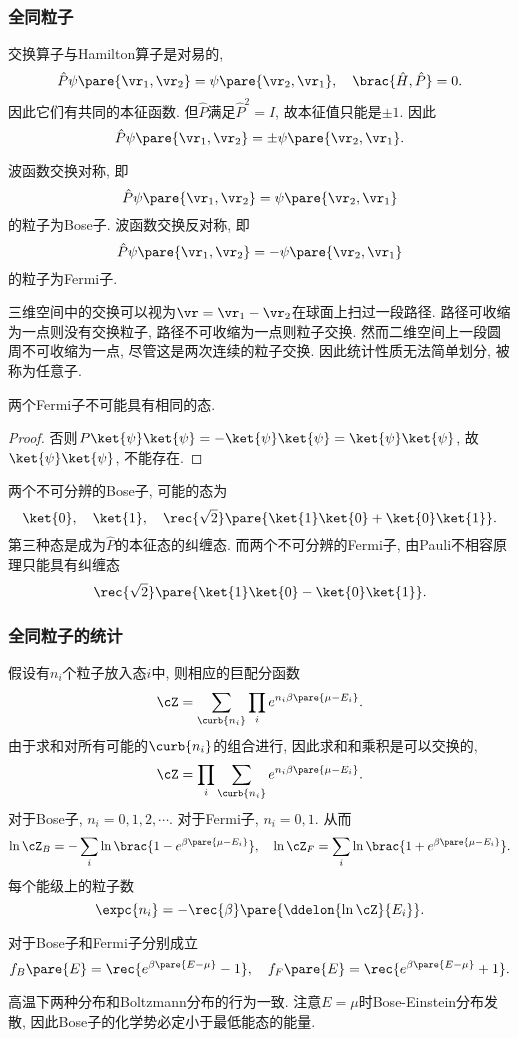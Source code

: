 \documentclass[../Thermal.tex]{subfiles}
\begin{document}
\subsubsection{全同粒子}
交换算子与Hamilton算子是对易的,
\[ \hat{P}\psi\pare{\vr_1, \vr_2}=\psi\pare{\vr_2,\vr_1},\quad \brac{\hat{H},\hat{P}} = 0. \]
因此它们有共同的本征函数. 但$\hat{P}$满足$\hat{P}^2=I$, 故本征值只能是$\pm 1$. 因此
\[ \hat{P} \psi\pare{\vr_1,\vr_2} = \pm\psi\pare{\vr_2,\vr_1}. \]
\begin{finale}
\begin{axiom}
波函数交换对称, 即
\[ \hat{P} \psi\pare{\vr_1,\vr_2} = \psi\pare{\vr_2,\vr_1} \]
的粒子为Bose子. 波函数交换反对称, 即
\[ \hat{P} \psi\pare{\vr_1,\vr_2} = -\psi\pare{\vr_2,\vr_1} \]
的粒子为Fermi子.
\end{axiom}
\end{finale}
\begin{remark}
三维空间中的交换可以视为$\vr = \vr_1 - \vr_2$在球面上扫过一段路径. 路径可收缩为一点则没有交换粒子, 路径不可收缩为一点则粒子交换. 然而二维空间上一段圆周不可收缩为一点, 尽管这是两次连续的粒子交换. 因此统计性质无法简单划分, 被称为任意子.
\end{remark}
\begin{corollary}[Pauli不相容原理]
两个Fermi子不可能具有相同的态.
\end{corollary}
\begin{proof}
否则$P\ket{\psi}\ket{\psi} = -\ket{\psi}\ket{\psi} = \ket{\psi}\ket{\psi}$, 故$\ket{\psi}\ket{\psi}$, 不能存在.
\end{proof}
两个不可分辨的Bose子, 可能的态为
\[ \ket{0},\quad \ket{1},\quad \rec{\sqrt{2}}\pare{\ket{1}\ket{0} + \ket{0}\ket{1}}. \]
第三种态是成为$\hat{P}$的本征态的纠缠态. 而两个不可分辨的Fermi子, 由Pauli不相容原理只能具有纠缠态
\[ \rec{\sqrt{2}}\pare{\ket{1}\ket{0} - \ket{0}\ket{1}}. \]
\subsubsection{全同粒子的统计}
假设有$n_i$个粒子放入态$i$中, 则相应的巨配分函数
\[ \cZ = \sum_{\curb{n_i}} \prod_i e^{n_i\beta\pare{\mu - E_i}}. \]
由于求和对所有可能的$\curb{n_i}$的组合进行, 因此求和和乘积是可以交换的,
\[ \cZ = \prod_i \sum_{\curb{n_i}} e^{n_i\beta\pare{\mu - E_i}}. \]
对于Bose子, $n_i = 0, 1, 2, \cdots$. 对于Fermi子, $n_i=0,1$. 从而
\begin{equation}
\label{eq:partitionofquantum}
\ln \cZ_B = -\sum_i \ln\brac{1 - e^{\beta\pare{\mu-E_i}}},\quad \ln \cZ_F = \sum_i \ln\brac{1 + e^{\beta\pare{\mu - E_i}}}.
\end{equation}
每个能级上的粒子数
\[ \expc{n_i} = -\rec{\beta}\pare{\ddelon{\ln\cZ}{E_i}}. \]
\begin{finale}
\begin{theorem}
\label{thm:quantumdistribution}
对于Bose子和Fermi子分别成立
\[ f_B\pare{E} = \rec{e^{\beta\pare{E-\mu}} - 1},\quad f_F\pare{E} = \rec{e^{\beta\pare{E-\mu}} + 1}. \]
\end{theorem}
\end{finale}
\begin{remark}
高温下两种分布和Boltzmann分布的行为一致. 注意$E=\mu$时Bose-Einstein分布发散, 因此Bose子的化学势必定小于最低能态的能量.
\end{remark}
\end{document}
